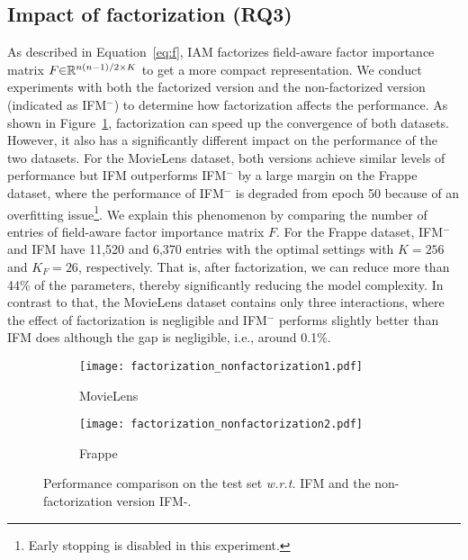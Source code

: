 \documentclass[letterpaper]{article} \usepackage{aaai19}  \usepackage{times}  \usepackage{helvet}  \usepackage{courier}  \usepackage{url}  \usepackage{graphicx}  \frenchspacing  \setlength{\pdfpagewidth}{8.5in}  \setlength{\pdfpageheight}{11in}  \usepackage{mathtools}
\begin{document}
\subsection{Impact of factorization (\textbf{RQ3})}
As described in Equation~\ref{eq:f}, IAM factorizes field-aware factor importance matrix $F\text{\ensuremath{\in}}\mathbb{R}^{ n(n-1)/2 \times K}$ to get a more compact representation. We conduct experiments with both the factorized version and the non-factorized version (indicated as IFM$^-$)
to determine how factorization affects the performance. As shown in Figure~\ref{fig:factorization_nonfactorization}, factorization can speed up the convergence of both datasets. However, it also has a significantly different impact on the performance of the two datasets. For the MovieLens dataset, both versions achieve similar levels of performance but IFM outperforms IFM$^-$ by a large margin on the Frappe dataset, where the performance of IFM$^-$ is degraded from epoch 50 because of an overfitting issue\footnote{Early stopping is disabled in this experiment.}. We explain this phenomenon by comparing the number of entries of field-aware factor importance matrix $F$. For the Frappe dataset, IFM$^-$ and IFM have 11,520 and 6,370 entries with the optimal settings with $K=256$ and $K_F=26$, respectively. That is, after factorization, we can reduce more than 44\% of the parameters, thereby significantly reducing the model complexity. In contrast to that, the MovieLens dataset contains only three interactions, where the effect of factorization is negligible and IFM$^-$ performs slightly better than IFM does although the gap is negligible, i.e., around 0.1\%.



\begin{figure}[t!]
\begin{center} 
\begin{subfigure}[MovieLens]{0.47\columnwidth}
{
\texttt{[image: factorization\_nonfactorization1.pdf]}
\caption{MovieLens}
} 
\end{subfigure}
\begin{subfigure}[Frappe]{0.47\columnwidth}
{
\texttt{[image: factorization\_nonfactorization2.pdf]}
\caption{Frappe}
} 
\end{subfigure}
\caption{ Performance comparison on the test set \emph{w.r.t.} IFM and the non-factorization version IFM-.}
\label{fig:factorization_nonfactorization} 
\end{center}
\end{figure} 
\end{document}
